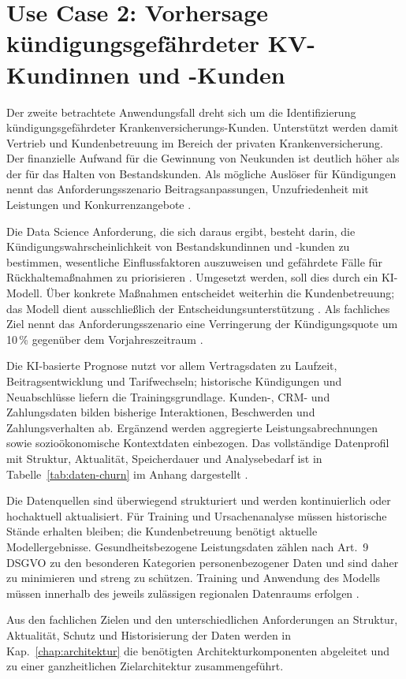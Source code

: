 \section{Use Case 2: Vorhersage kündigungsgefährdeter KV-Kundinnen und -Kunden}
\label{sec:churn}


Der zweite betrachtete Anwendungsfall dreht sich um die Identifizierung 
kündigungsgefährdeter Krankenversicherungs-Kunden.
Unterstützt werden damit Vertrieb und Kundenbetreuung
im Bereich der privaten Krankenversicherung. 
Der finanzielle Aufwand für die Gewinnung von Neukunden
ist deutlich höher als der für das Halten von Bestandskunden.
Als mögliche Auslöser für Kündigungen nennt das
Anforderungsszenario Beitragsanpassungen, Unzufriedenheit mit Leistungen und
Konkurrenzangebote
\citep[Folie~17]{nordakademieSzenarioVersicherung}.

Die Data Science Anforderung, die sich daraus ergibt, 
besteht darin, die Kündigungswahrscheinlichkeit von Bestandskundinnen und
-kunden zu bestimmen, wesentliche Einflussfaktoren auszuweisen und gefährdete Fälle
für Rückhaltemaßnahmen zu priorisieren \citep{spiteri2018}. 
Umgesetzt werden, soll dies durch ein KI-Modell.
Über konkrete Maßnahmen entscheidet weiterhin die Kundenbetreuung; das Modell dient
ausschließlich der Entscheidungsunterstützung
\citep[Folie~17]{nordakademieSzenarioVersicherung}. Als fachliches Ziel nennt
das Anforderungsszenario eine Verringerung der Kündigungsquote um 10\,\%
gegenüber dem Vorjahreszeitraum
\citep[Folie~17]{nordakademieSzenarioVersicherung}. 

Die KI-basierte Prognose nutzt vor allem Vertragsdaten zu 
Laufzeit, Beitragsentwicklung und Tarifwechseln; 
historische Kündigungen und Neuabschlüsse liefern die
Trainingsgrundlage. Kunden-, CRM- und Zahlungsdaten bilden bisherige
Interaktionen, Beschwerden und Zahlungsverhalten ab. Ergänzend werden
aggregierte Leistungsabrechnungen sowie sozioökonomische Kontextdaten
einbezogen.
Das vollständige Datenprofil mit Struktur, Aktualität, Speicherdauer und
Analysebedarf ist in Tabelle~\ref{tab:daten-churn} im Anhang dargestellt
\citep[Folien~17--18]{nordakademieSzenarioVersicherung}.

Die Datenquellen sind überwiegend strukturiert und werden kontinuierlich oder
hochaktuell aktualisiert. Für Training und Ursachenanalyse müssen historische
Stände erhalten bleiben; die Kundenbetreuung benötigt aktuelle
Modellergebnisse. Gesundheitsbezogene Leistungsdaten zählen nach Art.~9 DSGVO
zu den besonderen Kategorien personenbezogener Daten und sind daher zu
minimieren und streng zu schützen.
Training und Anwendung des Modells müssen innerhalb des
jeweils zulässigen regionalen Datenraums erfolgen
\citep{euGDPR}.

Aus den fachlichen Zielen und den unterschiedlichen Anforderungen an
Struktur, Aktualität, Schutz und Historisierung der Daten werden in
Kap.~\ref{chap:architektur} die benötigten Architekturkomponenten
abgeleitet und zu einer ganzheitlichen Zielarchitektur zusammengeführt.
